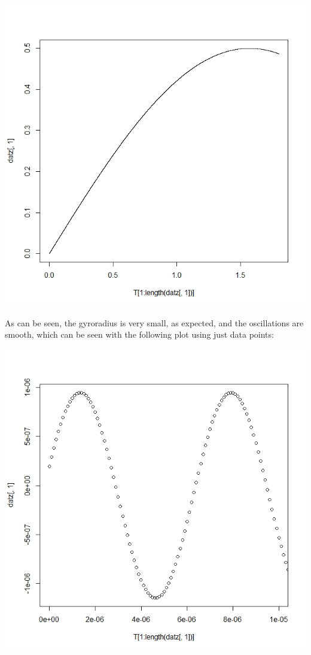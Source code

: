 \documentclass[12pt]{article}
\begin{document}
\includegraphics[scale=0.4]{zvt(L=1,R=2)}

As can be seen, the gyroradius is very small, as expected, and the oscillations are smooth, which can be seen with the following plot using just data points:

\includegraphics[scale=0.4]{xvtp(L=1,R=2)}
\end{document}
